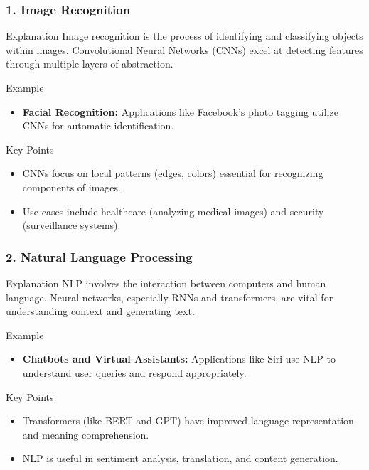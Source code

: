 \documentclass[aspectratio=169]{beamer}
\begin{document}
\begin{frame}[fragile]
    \frametitle{1. Image Recognition}
    \begin{block}{Explanation}
        Image recognition is the process of identifying and classifying objects within images. Convolutional Neural Networks (CNNs) excel at detecting features through multiple layers of abstraction.
    \end{block}
    
    \begin{block}{Example}
        \begin{itemize}
            \item \textbf{Facial Recognition:} Applications like Facebook's photo tagging utilize CNNs for automatic identification.
        \end{itemize}
    \end{block}
    
    \begin{block}{Key Points}
        \begin{itemize}
            \item CNNs focus on local patterns (edges, colors) essential for recognizing components of images.
            \item Use cases include healthcare (analyzing medical images) and security (surveillance systems).
        \end{itemize}
    \end{block}
\end{frame}

\begin{frame}[fragile]
    \frametitle{2. Natural Language Processing}
    \begin{block}{Explanation}
        NLP involves the interaction between computers and human language. Neural networks, especially RNNs and transformers, are vital for understanding context and generating text.
    \end{block}
    
    \begin{block}{Example}
        \begin{itemize}
            \item \textbf{Chatbots and Virtual Assistants:} Applications like Siri use NLP to understand user queries and respond appropriately.
        \end{itemize}
    \end{block}
    
    \begin{block}{Key Points}
        \begin{itemize}
            \item Transformers (like BERT and GPT) have improved language representation and meaning comprehension.
            \item NLP is useful in sentiment analysis, translation, and content generation.
        \end{itemize}
    \end{block}
\end{frame}
\end{document}
